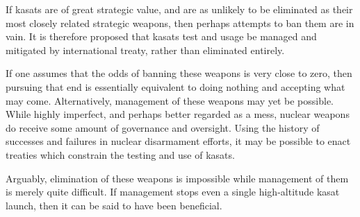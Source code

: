 If \acp{kasat} are of great strategic value, and are as unlikely to be
eliminated as their most closely related strategic weapons, then
perhaps attempts to ban them are in vain.  It is therefore proposed
that \acp{kasat} test and usage be managed and mitigated by
international treaty, rather than eliminated entirely.

If one assumes that the odds of banning these weapons is very close to
zero, then pursuing that end is essentially equivalent to doing
nothing and accepting what may come.  Alternatively, management of
these weapons may yet be possible.  While highly imperfect, and
perhaps better regarded as a mess, nuclear weapons do receive some
amount of governance and oversight.  Using the history of successes
and failures in nuclear disarmament efforts, it may be possible to
enact treaties which constrain the testing and use of \acp{kasat}.

Arguably, elimination of these weapons is impossible while management
of them is merely quite difficult.  If management stops even a single
high-altitude \ac{kasat} launch, then it can be said to have been
beneficial.
